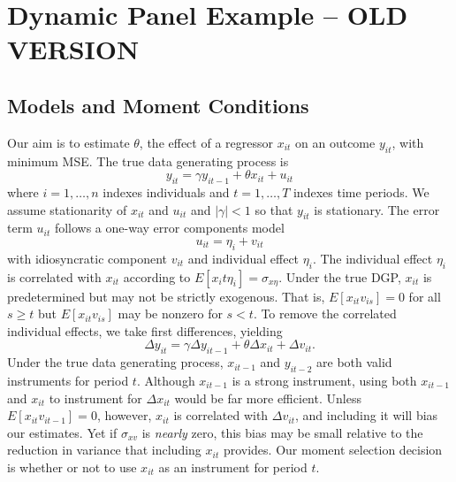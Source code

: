 \section{Dynamic Panel Example -- OLD VERSION}

\subsection{Models and Moment Conditions}
Our aim is to estimate $\theta$, the effect of a regressor $x_{it}$ on an outcome $y_{it}$, with minimum MSE. The true data generating process is 
	\begin{equation}
				y_{it} = \gamma y_{it-1} + \theta x_{it} + u_{it}
	\end{equation}
where $i = 1, \hdots, n$ indexes individuals and $t=1, \hdots, T$  indexes time periods. We assume stationarity of $x_{it}$ and $u_{it}$ and $|\gamma|<1$ so that $y_{it}$ is stationary. The error term $u_{it}$ follows a one-way error components model
	\begin{equation}
				u_{it}= \eta_i + v_{it}
	\end{equation}
with idiosyncratic component $v_{it}$ and individual effect $\eta_i$. 
The individual effect $\eta_i$ is correlated with $x_{it}$ according to $E[x_it \eta_i]= \sigma_{x\eta}$. 
Under the true DGP, $x_{it}$ is predetermined but may not be strictly exogenous. 
That is, $E[x_{it}v_{is}] = 0$ for all $s\geq t$ but $E[x_{it}v_{is}]$ may be nonzero for $s<t$. 
To remove the correlated individual effects, we take first differences, yielding
	\begin{equation}
	\Delta y_{it} = \gamma \Delta y_{it-1} + \theta \Delta x_{it} + \Delta v_{it}.
	\end{equation}
Under the true data generating process, $x_{it-1}$ and $y_{it-2}$ are both valid instruments for period $t$.
Although $x_{it-1}$ is a strong instrument, using both $x_{it-1}$ and $x_{it}$ to instrument for $\Delta x_{it}$ would be far more efficient. 
Unless $E[x_{it}v_{it-1}]=0$, however, $x_{it}$ is correlated with $\Delta v_{it}$, and including it will bias our estimates. 
Yet if $\sigma_{xv}$ is \emph{nearly} zero, this bias may be small relative to the reduction in variance that including $x_{it}$ provides.  
Our moment selection decision is whether or not to use $x_{it}$ as an instrument for period $t$.


